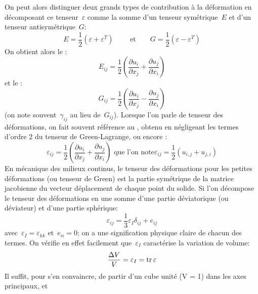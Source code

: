 \medskip
On peut alors distinguer deux grands types de contribution à la déformation en décomposant
ce tenseur~$\varepsilon$ comme la somme d'un tenseur symétrique~$E$ et d'un tenseur antisymétrique~$G$:
\begin{equation} E=\frac12(\varepsilon+\varepsilon^T) \qquad \text{ et}\qquad G=\frac12(\varepsilon-\varepsilon^T) \end{equation}
On obtient alors le :
\begin{equation}E_{ij}=\frac12\left(\frac{\partial u_i}{\partial x_j}+\frac{\partial u_j}{\partial x_i}\right)\end{equation}
et le :
\begin{equation}G_{ij}=\frac12\left(\frac{\partial u_i}{\partial x_j}-\frac{\partial u_j}{\partial x_i}\right)\end{equation} (on note
souvent~$\gamma_{ij}$ au lieu de~$G_{ij}$).
\medskipvm
Lorsque l'on parle de tenseur des déformations, on fait souvent référence au , obtenu en négligeant
les termes d'ordre 2 du tenseur de Green-Lagrange, ou encore :
\begin{equation}
\varepsilon_{ij}=\frac12\left(\frac{\partial u_i}{\partial x_j}+\frac{\partial u_j}{\partial x_i}\right)
\text{ que l'on note}
\varepsilon_{ij}=\frac12(u_{i,j}+u_{j,i})
\end{equation}
\medskipvm
En mécanique des milieux continus, le tenseur des déformations pour les petites déformations
(ou tenseur de Green) est la partie symétrique de la matrice jacobienne du vecteur déplacement
de chaque point du solide.
\medskipvm
Si l'on décompose le tenseur des déformations en une somme d'une partie déviatorique
(ou déviateur) et d'une partie sphérique:
\begin{equation} \varepsilon_{ij}=\frac13\varepsilon_I\delta_{ij}+e_{ij} \end{equation}
avec~$\varepsilon_I=\varepsilon_{kk}$ et~$e_{ii}=0$;
on a une signification physique claire de chacun des termes.
On vérifie en effet facilement que~$\varepsilon_I$ caractérise la variation de volume:
\begin{equation} \frac{\Delta V}V=\varepsilon_I=\operatorname{tr} \varepsilon \end{equation}
 Il suffit, pour s'en convaincre, de partir d'un cube unité (V = 1) dans les axes principaux, et
